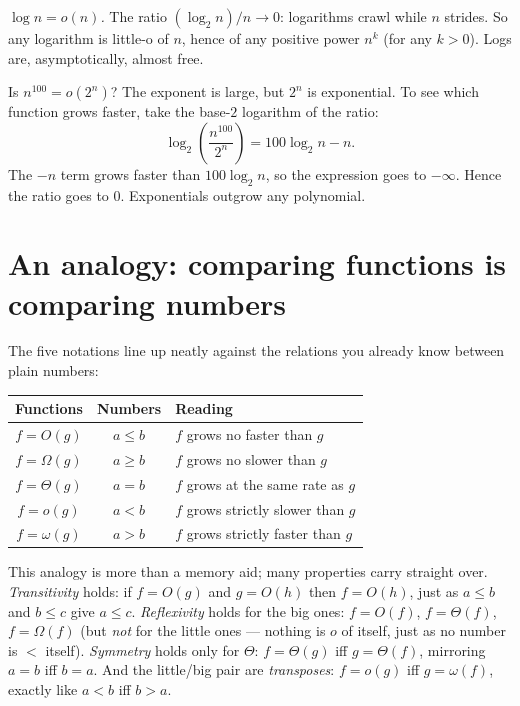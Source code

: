 \begin{example}\label{ch03:ex-logvspoly}
\emph{$\log n = o(n)$.} The ratio $(\log_2 n)/n \to 0$: logarithms crawl while $n$
strides. So any logarithm is little-o of $n$, hence of any positive power $n^k$ (for any $k > 0$).
Logs are, asymptotically, almost free.
\end{example}

\begin{walkbox}
Is $n^{100} = o(2^n)$? The exponent is large, but $2^n$ is exponential.
To see which function grows faster, take the base-$2$ logarithm of the ratio:
\[
  \log_2\!\left(\frac{n^{100}}{2^n}\right) = 100\log_2 n - n .
\]
The $-n$ term grows faster than $100\log_2 n$, so the expression goes to $-\infty$. Hence the ratio goes to $0$. Exponentials outgrow any polynomial.
\end{walkbox}

\section{An analogy: comparing functions is comparing numbers}

The five notations line up neatly against the relations you already know between plain
numbers:

\begin{center}
\begin{tabular}{ccl}
\toprule
Functions & Numbers & Reading \\
\midrule
$f = O(g)$       & $a \le b$ & $f$ grows no faster than $g$ \\
$f = \Omega(g)$  & $a \ge b$ & $f$ grows no slower than $g$ \\
$f = \Theta(g)$  & $a = b$   & $f$ grows at the same rate as $g$ \\
$f = o(g)$       & $a < b$   & $f$ grows strictly slower than $g$ \\
$f = \omega(g)$  & $a > b$   & $f$ grows strictly faster than $g$ \\
\bottomrule
\end{tabular}
\end{center}

This analogy is more than a memory aid; many properties carry straight over.
\emph{Transitivity} holds: if $f = O(g)$ and $g = O(h)$ then $f = O(h)$, just as
$a\le b$ and $b\le c$ give $a \le c$. \emph{Reflexivity} holds for the big ones:
$f = O(f)$, $f=\Theta(f)$, $f=\Omega(f)$ (but \emph{not} for the little ones --- nothing
is $o$ of itself, just as no number is $<$ itself). \emph{Symmetry} holds only for
$\Theta$: $f=\Theta(g)$ iff $g=\Theta(f)$, mirroring $a=b$ iff $b=a$. And the little/big
pair are \emph{transposes}: $f = o(g)$ iff $g = \omega(f)$, exactly like $a<b$ iff $b>a$.

